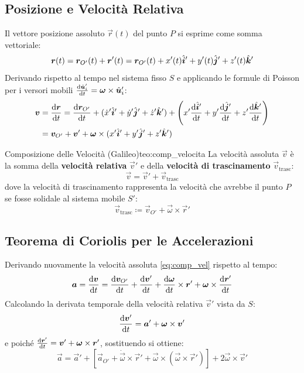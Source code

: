 \subsection{Posizione e Velocità Relativa}
Il vettore posizione assoluto $\vec{r}(t)$ del punto $P$ si esprime come somma vettoriale:
\begin{equation}
    \bm{r}(t) = \bm{r}_{O'}(t) + \bm{r}'(t) = \bm{r}_{O'}(t) + x'(t)\hat{\bm{i}}' + y'(t)\hat{\bm{j}}' + z'(t)\hat{\bm{k}}'
    \label{eq:pos_rel}
\end{equation}
Derivando rispetto al tempo nel sistema fisso $S$ e applicando le formule di Poisson per i versori mobili $\frac{\mathrm{d} \hat{\bm{u}}'_i}{\mathrm{d} t} = \bm{\omega} \times \hat{\bm{u}}'_i$:
\begin{align}
    \bm{v} &= \frac{\mathrm{d} \bm{r}}{\mathrm{d} t} = \frac{\mathrm{d} \bm{r}_{O'}}{\mathrm{d} t} + (\dot{x}'\hat{\bm{i}}' + \dot{y}'\hat{\bm{j}}' + \dot{z}'\hat{\bm{k}}') + \left(x'\frac{\mathrm{d} \hat{\bm{i}}'}{\mathrm{d} t} + y'\frac{\mathrm{d} \hat{\bm{j}}'}{\mathrm{d} t} + z'\frac{\mathrm{d} \hat{\bm{k}}'}{\mathrm{d} t}\right) \nonumber \\
    &= \bm{v}_{O'} + \bm{v}' + \bm{\omega}\times(x'\hat{\bm{i}}' + y'\hat{\bm{j}}' + z'\hat{\bm{k}}')
\end{align}

\begin{teorema}{Composizione delle Velocità (Galileo)}{teo:comp_velocita}
La velocità assoluta $\vec{v}$ è la somma della \textbf{velocità relativa} $\vec{v}'$ e della \textbf{velocità di trascinamento} $\vec{v}_{\text{trasc}}$:
\begin{equation}
    \vec{v} = \vec{v}' + \vec{v}_{\text{trasc}}
    \label{eq:comp_vel}
\end{equation}
dove la velocità di trascinamento rappresenta la velocità che avrebbe il punto $P$ se fosse solidale al sistema mobile $S'$:
\begin{equation}
    \vec{v}_{\text{trasc}} \coloneqq \vec{v}_{O'} + \vec{\omega}\times\vec{r}'
\end{equation}
\end{teorema}

\subsection{Teorema di Coriolis per le Accelerazioni}

Derivando nuovamente la velocità assoluta \eqref{eq:comp_vel} rispetto al tempo:
\begin{equation}
    \bm{a} = \frac{\mathrm{d} \bm{v}}{\mathrm{d} t} = \frac{\mathrm{d} \bm{v}_{O'}}{\mathrm{d} t} + \frac{\mathrm{d} \bm{v}'}{\mathrm{d} t} + \frac{\mathrm{d} \bm{\omega}}{\mathrm{d} t}\times\bm{r}' + \bm{\omega}\times\frac{\mathrm{d} \bm{r}'}{\mathrm{d} t}
\end{equation}
Calcolando la derivata temporale della velocità relativa $\vec{v}'$ vista da $S$:
\begin{equation}
    \frac{\mathrm{d} \bm{v}'}{\mathrm{d} t} = \bm{a}' + \bm{\omega}\times\bm{v}'
\end{equation}
e poiché $\frac{\mathrm{d} \bm{r}'}{\mathrm{d} t} = \bm{v}' + \bm{\omega}\times\bm{r}'$, sostituendo si ottiene:
\begin{equation}
    \vec{a} = \vec{a}' + \left[\vec{a}_{O'} + \dot{\vec{\omega}}\times\vec{r}' + \vec{\omega}\times(\vec{\omega}\times\vec{r}')\right] + 2\vec{\omega}\times\vec{v}'
\end{equation}

